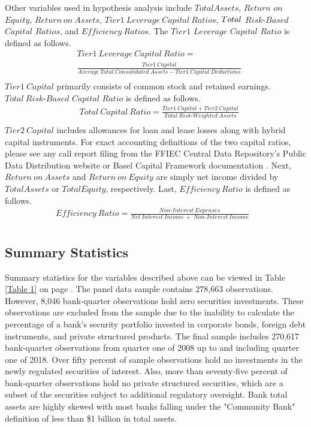 \documentclass[preprint,12pt]{elsarticle}
\begin{document}
Other variables used in hypothesis analysis include $TotalAssets$, $Return$ $on$ $Equity$,
$Return \ on \ Assets$, $Tier1 \ Leverage \ Capital \ Ratios$,  
$Total \\$ $Risk\textrm{-}Based$ $Capital$ $Ratios$, and $Efficiency \ Ratios$.  The $Tier1$ $Leverage$ $Capital$ $Ratio$ is defined as follows.
\begin{align*}
&Tier1 \ Leverage \ Capital \ Ratio = \\ 
&\frac{Tier1 \ Capital}{Average \ Total \ Consolidated \ Assets - Tier1 \ Capital \ Deductions} \\
&
\end{align*} $Tier1 \ Capital$ primarily consists of common stock and retained earnings.  $Total \ Risk\textrm{-}Based$ $Capital$  $Ratio$ is defined as follows. 
\begin{align*}
&Total \ Capital \ Ratio = 
\frac{Tier1 \ Capital + Tier2 \ Capital}{Total \ Risk\textrm{-}Weighted \ Assets} \\
&
\end{align*}
$Tier2 \ Capital$ includes allowances for loan and lease losses along with hybrid capital instruments.  For exact accounting definitions of the two capital ratios, please see any call report filing from the FFIEC Central Data Repository's Public Data Distribution website or Basel Capital Framework documentation \citep{CommitteeonBankingSupervision2011}.  Next, $Return \ on \ Assets$ and $Return \ on \ Equity$ are simply net income divided by $TotalAssets$ or $TotalEquity$, respectively.  Last, $Efficiency \ Ratio$ is defined as follows.
\begin{align*}
Efficiency \ Ratio = \frac{Non\textrm{-}Interest \ Expenses}{Net \ Interest \ Income \ + \ Non\textrm{-}Interest \ Income} \\
&
\end{align*}
\subsection{Summary Statistics}
Summary statistics for the variables described above can be viewed in Table \ref{Table 1} on page \pageref{Table 1}.  The panel data sample contains 278,663 observations.  However, 8,046 bank-quarter observations hold zero securities investments.  These observations are excluded from the sample due to the inability to calculate the percentage of a bank's security portfolio invested in corporate bonds, foreign debt instruments, and private structured products.  The final sample includes 270,617 bank-quarter observations from quarter one of 2008 up to and including quarter one of 2018.  Over fifty percent of sample observations hold no investments in the newly regulated securities of interest.  Also, more than seventy-five percent of bank-quarter observations hold no private structured securities, which are a subset of the securities subject to additional regulatory oversight.  Bank total assets are highly skewed with most banks falling under the "Community Bank" definition of less than \$1 billion in total assets.  
\end{document}
